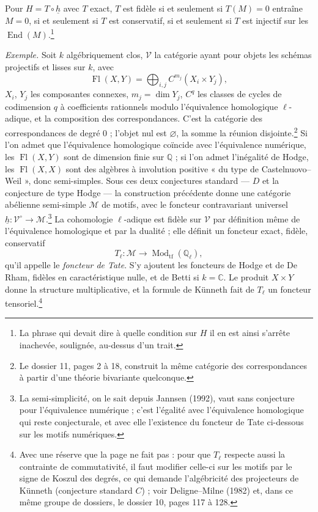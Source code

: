 \documentclass[11pt,a4paper]{article}
\begin{document}
Pour $H = T \circ \underline{h}$ avec $T$ exact, $T$ est fidèle si et seulement si
$T(M) = 0$ entraîne $M = 0$, si et seulement si $T$ est conservatif, si et seulement
si $T$ est injectif sur les $\operatorname{End}(M)$.\footnote{La phrase qui devait
dire à quelle condition sur $H$ il en est ainsi s'arrête inachevée, soulignée,
au-dessus d'un trait.}

\emph{Exemple.} Soit $k$ algébriquement clos, $\mathcal{V}$ la catégorie ayant pour
objets les schémas projectifs et lisses sur $k$, avec
\[
\operatorname{Fl}(X, Y) = \bigoplus_{i,j} C^{m_{j}}(X_{i} \times Y_{j}) ,
\]
$X_{i}$, $Y_{j}$ les composantes connexes, $m_{j} = \dim Y_{j}$, $C^{q}$ les classes
de cycles de codimension $q$ à coefficients rationnels modulo l'équivalence
homologique $\ell$-adique, et la composition des correspondances. C'est la catégorie
des correspondances de degré $0$ ; l'objet nul est $\varnothing$, la somme la
réunion disjointe.\footnote{Le dossier 11, pages 2 à 18, construit la même catégorie
des correspondances à partir d'une théorie bivariante quelconque.} Si l'on admet que
l'équivalence homologique coïncide avec l'équivalence numérique, les
$\operatorname{Fl}(X,Y)$ sont de dimension finie sur $\mathbb{Q}$ ; si l'on admet
l'inégalité de Hodge, les $\operatorname{Fl}(X,X)$ sont des algèbres à involution
positive « du type de Castelnuovo--Weil », donc semi-simples. Sous ces deux
conjectures standard --- $D$ et la conjecture de type Hodge --- la construction
précédente donne une catégorie abélienne semi-simple $\mathcal{M}$ de motifs, avec
le foncteur contravariant universel $\underline{h} \colon \mathcal{V}^{\circ} \to
\mathcal{M}$.\footnote{La semi-simplicité, on le sait depuis Jannsen (1992), vaut
sans conjecture pour l'équivalence numérique ; c'est l'égalité avec l'équivalence
homologique qui reste conjecturale, et avec elle l'existence du foncteur de Tate
ci-dessous sur les motifs numériques.} La cohomologie $\ell$-adique est fidèle sur
$\mathcal{V}$ par définition même de l'équivalence homologique et par la dualité ; elle
définit un foncteur exact, fidèle, conservatif
\[
T_{\ell} \colon \mathcal{M} \longrightarrow \operatorname{Mod}_{\mathrm{tf}}(\mathbb{Q}_{\ell}) ,
\]
qu'il appelle le \emph{foncteur de Tate}. S'y ajoutent les foncteurs de Hodge et de
De Rham, fidèles en caractéristique nulle, et de Betti si $k = \mathbb{C}$. Le produit
$X \times Y$ donne la structure multiplicative, et la formule de Künneth fait de
$T_{\ell}$ un foncteur tensoriel.\footnote{Avec une réserve que la page ne fait pas :
pour que $T_{\ell}$ respecte aussi la contrainte de commutativité, il faut modifier
celle-ci sur les motifs par le signe de Koszul des degrés, ce qui demande
l'algébricité des projecteurs de Künneth (conjecture standard $C$) ; voir
Deligne--Milne (1982) et, dans ce même groupe de dossiers, le dossier 10, pages 117
à 128.}
\end{document}
